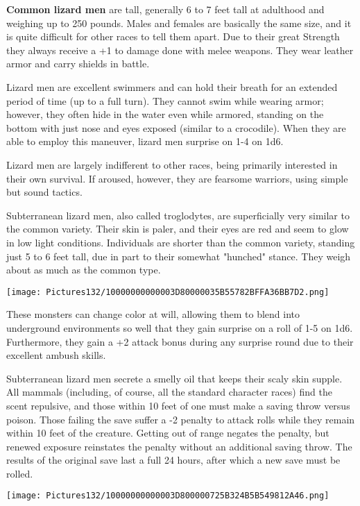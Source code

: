 \documentclass[a4paper,twoside,openany,10pt]{book}
\begin{document}
\begin{multicols}{2}
\textbf{Common lizard men }are tall, generally 6 to 7 feet tall at adulthood and weighing up to 250 pounds. Males and females are basically the same size, and it is quite difficult for other races to tell them apart. Due to their great Strength they always receive a +1 to damage done with melee weapons. They wear leather armor and carry shields in battle.

Lizard men are excellent swimmers and can hold their breath for an extended period of time (up to a full turn). They cannot swim while wearing armor; however, they often hide in the water even while armored, standing on the bottom with just nose and eyes exposed (similar to a crocodile). When they are able to employ this maneuver, lizard men surprise on 1-4 on 1d6.

Lizard men are largely indifferent to other races, being primarily interested in their own survival. If aroused, however, they are fearsome warriors, using simple but sound tactics. 

Subterranean lizard men, also called troglodytes, are superficially very similar to the common variety. Their skin is paler, and their eyes are red and seem to glow in low light conditions. Individuals are shorter than the common variety, standing just 5 to 6 feet tall, due in part to their somewhat "hunched" stance. They weigh about as much as the common type.


\begin{center} \texttt{[image: Pictures132/10000000000003D80000035B55782BFFA36BB7D2.png]} \end{center}


These monsters can change color at will, allowing them to blend into underground environments so well that they gain surprise on a roll of 1-5 on 1d6. Furthermore, they gain a +2 attack bonus during any surprise round due to their excellent ambush skills.

Subterranean lizard men secrete a smelly oil that keeps their scaly skin supple. All mammals (including, of course, all the standard character races) find the scent repulsive, and those within 10 feet of one must make a saving throw versus poison. Those failing the save suffer a -2 penalty to attack rolls while they remain within 10 feet of the creature. Getting out of range negates the penalty, but renewed exposure reinstates the penalty without an additional saving throw. The results of the original save last a full 24 hours, after which a new save must be rolled.

\begin{center} \texttt{[image: Pictures132/10000000000003D800000725B324B5B549812A46.png]} \end{center}



\end{multicols}
\end{document}
